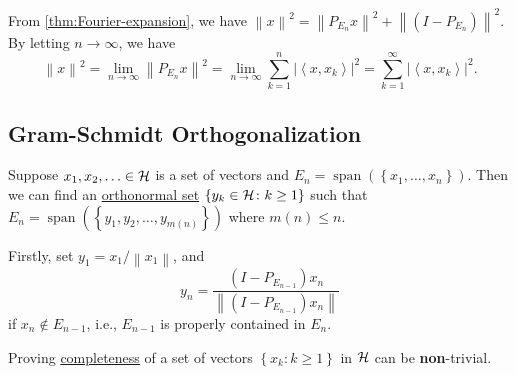 \begin{remark}
	From \autoref{thm:Fourier-expansion}, we have \(\left\lVert x\right\rVert ^{2} = \left\lVert P_{E_n} x \right\rVert^{2} + \left\lVert (I - P_{E_{n} })\right\rVert ^{2}\). By letting \(n \to \infty \), we have
	\[
		\left\lVert x\right\rVert^{2} = \lim\limits_{n \to \infty} \left\lVert P_{E_n}x\right\rVert ^{2} = \lim\limits_{n \to \infty} \sum_{k=1}^{n} \left\vert \left\langle x, x_{k}  \right\rangle  \right\vert ^{2} = \sum_{k=1}^{\infty} \left\vert \left\langle x, x_{k}  \right\rangle  \right\vert  ^{2}.
	\]
\end{remark}

\subsection{Gram-Schmidt Orthogonalization}

Suppose \(x_1, x_2, \ldots \in \mathcal{\MakeUppercase{h}}\) is a set of vectors and \(E_n = \mathop{\mathrm{span}}(\left\{ x_1, \ldots , x_n \right\} )\). Then we can find an \hyperref[def:orthonormal-system]{orthonormal set} \(\left\{ y_{k} \in \mathcal{\MakeUppercase{h}} \colon k\geq 1 \right\}\) such that \(E_n = \mathop{\mathrm{span}}(\left\{ y_1, y_2, \ldots , y_{m(n)}  \right\} )\) where \(m(n) \leq n\).

Firstly, set \(y_1 = x_1 / \left\lVert x_1\right\rVert \), and
\[
	y_n = \frac{(I - P_{E_{n-1}})x_n}{\left\lVert (I - P_{E_{n-1}})x_n \right\rVert}
\]
if \(x_n \notin E_{n-1}\), i.e., \(E_{n-1}\) is properly contained in \(E_n\).

\begin{remark}
	Proving \hyperref[def:complete-system]{completeness} of a set of vectors \(\left\{ x_k \colon k\geq 1 \right\} \) in \(\mathcal{\MakeUppercase{h}} \) can be \textbf{non}-trivial.
\end{remark}

